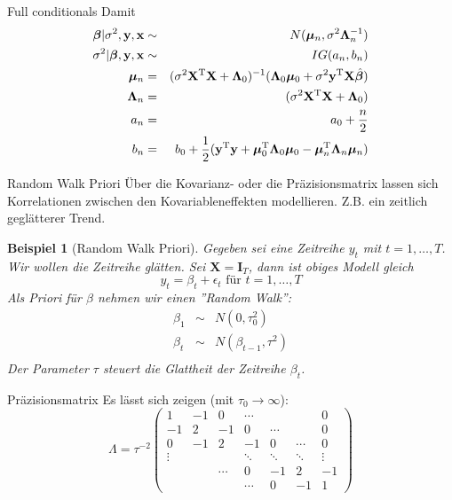 \documentclass[german]{beamer}
\newtheorem{Bsp}{Beispiel}
\numberwithin{Bsp}{section}
\numberwithin{Def}{section}
\numberwithin{Stz}{section}
\begin{document}
\begin{frame}{Full conditionals}
Damit 
\begin{eqnarray}
\boldsymbol\beta|\sigma^2,\mathbf{y},\mathbf{x} &\sim& N(\boldsymbol\mu_n,\sigma^2\boldsymbol\Lambda_n^{-1})\\
\sigma^2|\boldsymbol\beta,\mathbf{y},\mathbf{x}&\sim& IG(a_n,b_n)\\
\boldsymbol\mu_n&=&(\sigma^2\mathbf{X}^{\rm T}\mathbf{X}+\boldsymbol\Lambda_0)^{-1} (\boldsymbol\Lambda_0\boldsymbol\mu_0+\sigma^2\mathbf{y}^{\rm T}\mathbf{X}\hat{\boldsymbol\beta})\\
\boldsymbol\Lambda_n&=&(\sigma^2\mathbf{X}^{\rm T}\mathbf{X}+\boldsymbol\Lambda_0) \\
a_n&=&a_0+\frac{n}{2}\\
b_n&=&b_0+\frac{1}{2}(\mathbf{y}^{\rm T}\mathbf{y}+\boldsymbol\mu_0^{\rm T}\boldsymbol\Lambda_0\boldsymbol\mu_0-\boldsymbol\mu_n^{\rm T}\boldsymbol\Lambda_n\boldsymbol\mu_n) 
\end{eqnarray}
\end{frame}

\begin{frame}{Random Walk Priori}
Über die Kovarianz- oder die Präzisionsmatrix lassen sich Korrelationen zwischen den Kovariableneffekten modellieren. Z.B. ein zeitlich geglätterer Trend.
\begin{Bsp}[Random Walk Priori]
Gegeben sei eine Zeitreihe $y_t$ mit $t=1,\ldots,T$. Wir wollen die Zeitreihe glätten. Sei $\mathbf{X}=\mathbf{I}_T$, dann ist obiges Modell gleich
$$y_t =\beta_t + \epsilon_t \text{ für }t=1,\ldots,T$$
Als Priori für $\beta$ nehmen wir einen ''Random Walk'':
\begin{eqnarray*}
\beta_1 &\sim &N(0,\tau_0^2)\\
\beta_t &\sim &N(\beta_{t-1},\tau^2)\\
\end{eqnarray*}
Der Parameter $\tau$ steuert die \textit{Glattheit} der Zeitreihe $\beta_t$.
\end{Bsp}
\end{frame}

\begin{frame}{Präzisionsmatrix}
Es lässt sich zeigen (mit $\tau_0\to \infty$): 
$$ \Lambda = \tau^{-2}\left(\begin{array}{ccccccc}
1 & -1 & 0 & \cdots & & & 0\\
-1 & 2 & -1 & 0 & \cdots & & 0\\
0 & -1 & 2 & -1 & 0 & \cdots & 0\\
\vdots & & & \ddots & \ddots& \ddots & \vdots \\
& &  \cdots & 0 & -1 & 2 & -1 \\
& & & \cdots & 0 & -1 & 1
\end{array}\right) $$
\end{frame}
\end{document}
